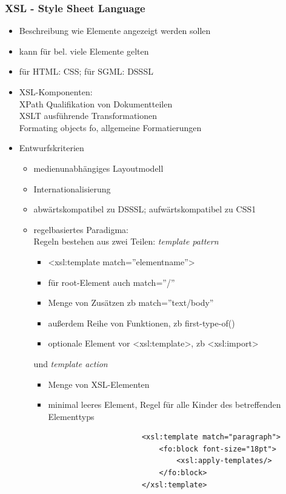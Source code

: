 \subsubsection{XSL - Style Sheet Language}
\begin{itemize}
	\item Beschreibung wie Elemente angezeigt werden sollen
	\item kann für bel. viele Elemente gelten
	\item für HTML: CSS; für SGML: DSSSL
	\item XSL-Komponenten:\\
	XPath Qualifikation von Dokumentteilen\\
	XSLT ausführende Transformationen\\
	Formating objects fo, allgemeine Formatierungen
	\item Entwurfskriterien
	\begin{itemize}
		\item medienunabhängiges Layoutmodell
		\item Internationalisierung
		\item abwärtskompatibel zu DSSSL; aufwärtskompatibel zu CSS1
		\item regelbasiertes Paradigma:\\
		Regeln bestehen aus zwei Teilen: \textit{template pattern}
		\begin{itemize}
			\item <xsl:template match=''elementname''>
			\item für root-Element auch match=''/''
			\item Menge von Zusätzen zb match=''text/body''
			\item außerdem Reihe von Funktionen, zb first-type-of()
			\item optionale Element vor <xsl:template>, zb <xsl:import>
		\end{itemize}
		und \textit{template action}
		\begin{itemize}
			\item Menge von XSL-Elementen
			\item minimal leeres Element, Regel für alle Kinder des betreffenden Elementtyps
			\begin{figure}[!h]
				\hspace{-7cm}
				\begin{lstlisting}
				<xsl:template match="paragraph">
					<fo:block font-size="18pt">
						<xsl:apply-templates/>
					</fo:block>
				</xsl:template>
				\end{lstlisting}

\end{figure}
\end{itemize}
\end{itemize}
\end{itemize}
